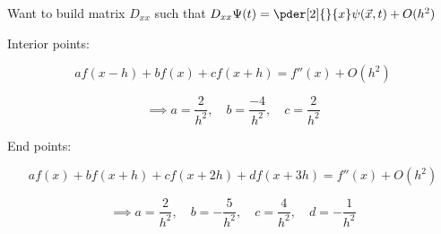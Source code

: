 Want to build matrix $D_{xx}$ such that $D_{xx} \Psi(t) = \pder[2]{}{x} \psi (\vec{x},t) + O(h^2)$

Interior points:

$$af(x - h) + b f(x) + cf(x + h) = f''(x) + O(h^2)$$

$$\implies a = \frac{2}{h^2}, \quad b = \frac{-4}{h^2}, \quad c = \frac{2}{h^2}$$

End points:

$$a f(x) + bf(x + h) + cf(x + 2h) + df(x + 3h) = f''(x) + O(h^2)$$

$$\implies a = \frac{2}{h^2}, \quad b = -\frac{5}{h^2}, \quad c = \frac{4}{h^2}, \quad d = -\frac{1}{h^2}$$